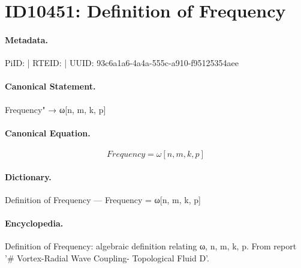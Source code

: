 \section*{ID10451: Definition of Frequency}
\paragraph{Metadata.}
PiID:  | RTEID:  | UUID: 93c6a1a6-4a4a-555c-a910-f95125354aee

\paragraph{Canonical Statement.}
Frequency" → ω[n, m, k, p]

\paragraph{Canonical Equation.}
\[
Frequency = ω[n, m, k, p]
\]

\paragraph{Dictionary.}
Definition of Frequency — Frequency = ω[n, m, k, p]

\paragraph{Encyclopedia.}
Definition of Frequency: algebraic definition relating ω, n, m, k, p. From report '\# Vortex-Radial Wave Coupling- Topological Fluid D'.
